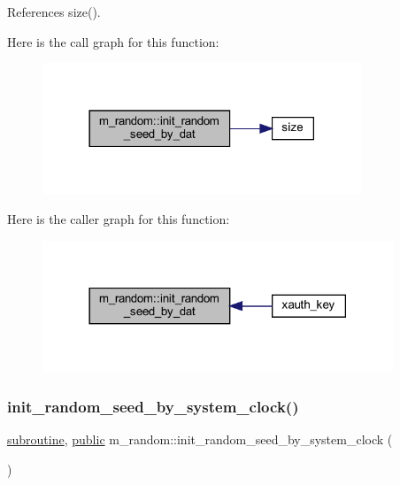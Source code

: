 References size().

Here is the call graph for this function\+:
\nopagebreak
\begin{figure}[H]
\begin{center}
\leavevmode
\includegraphics[width=270pt]{namespacem__random_a6e3975f994c77778043f3e5d00614317_cgraph}
\end{center}
\end{figure}
Here is the caller graph for this function\+:
\nopagebreak
\begin{figure}[H]
\begin{center}
\leavevmode
\includegraphics[width=297pt]{namespacem__random_a6e3975f994c77778043f3e5d00614317_icgraph}
\end{center}
\end{figure}
\mbox{\label{namespacem__random_a887216bea7a75b314e538afd3ebe2ff3}} 
\subsubsection{\texorpdfstring{init\+\_\+random\+\_\+seed\+\_\+by\+\_\+system\+\_\+clock()}{init\_random\_seed\_by\_system\_clock()}}
{\footnotesize\ttfamily \hyperlink{M__stopwatch_83_8txt_acfbcff50169d691ff02d4a123ed70482}{subroutine}, \hyperlink{M__stopwatch_83_8txt_a2f74811300c361e53b430611a7d1769f}{public} m\+\_\+random\+::init\+\_\+random\+\_\+seed\+\_\+by\+\_\+system\+\_\+clock (\begin{DoxyParamCaption}{ }\end{DoxyParamCaption})}



